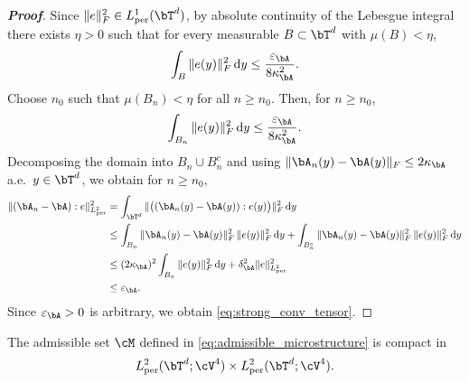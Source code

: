 \begin{proof}[\bf Proof]
Since $\|e\|_F^2\in L^1_{\rm per}(\bT^d)$, by absolute continuity of the Lebesgue integral there exists $\eta>0$ such that for every measurable $B\subset\bT^d$ with $\mu(B)<\eta$,
\begin{equation*}
\int_B \|e(y)\|_F^2\,\mathrm{d}y\le \frac{\varepsilon_{\bA}}{8\kappa_{\bA}^2}.
\end{equation*}
Choose $n_0$ such that $\mu(B_n)<\eta$ for all $n\ge n_0$. Then, for $n\ge n_0$,
\begin{equation*}
\int_{B_n} \|e(y)\|_F^2\,\mathrm{d}y\le \frac{\varepsilon_{\bA}}{8\kappa_{\bA}^2}.
\end{equation*}
Decomposing the domain into $B_n\cup B_n^c$ and using $\|\bA_n(y)-\bA(y)\|_F\le 2\kappa_{\bA}$ a.e.\ $y\in\bT^d$, we obtain for $n\ge n_0$,
\begin{align*}
\|(\bA_n-\bA):e\|_{L^2_{\rm per}}^2
&= \int_{\bT^d} \|\bigl((\bA_n(y)-\bA(y)):e(y)\bigr)\|_F^2\,\mathrm{d}y\\
&\le \int_{B_n} \|\bA_n(y)-\bA(y)\|_F^2\,\|e(y)\|_F^2\,\mathrm{d}y
    + \int_{B_n^c} \|\bA_n(y)-\bA(y)\|_F^2\,\|e(y)\|_F^2\,\mathrm{d}y\\
&\le (2\kappa_{\bA})^2\int_{B_n} \|e(y)\|_F^2\,\mathrm{d}y + \delta_{\bA}^2\|e\|_{L^2_{\rm per}}^2\\
&\le \varepsilon_{\bA}.
\end{align*}
Since $\varepsilon_{\bA}>0$ is arbitrary, we obtain \cref{eq:strong_conv_tensor}.
\end{proof}

\begin{lemma} \label{lem:bv_compact}
The admissible set $\cM$ defined in \cref{eq:admissible_microstructure} is compact in
\begin{equation*}
    L^2_{\mathrm{per}}(\bT^d;\cV^{4})\times
L^2_{\mathrm{per}}(\bT^d;\cV^{4}).
\end{equation*}
\end{lemma}

